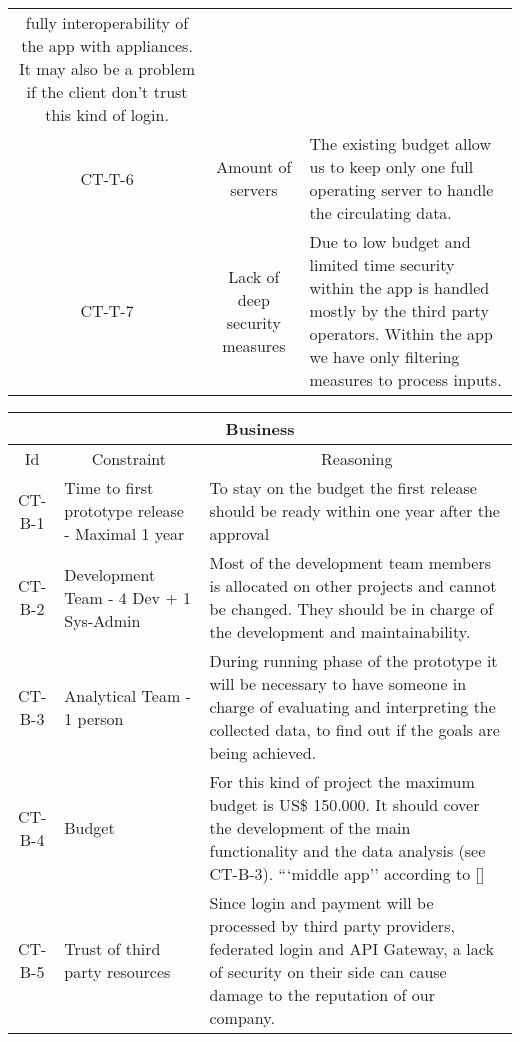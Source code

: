 \begin{table}[H]
\begin{tabularx}{\textwidth}{|c|c|X|}
        fully interoperability of the app with appliances. It may also be a problem if the \gls{client}
        don't trust this kind of login. \\
        CT-T-6 & Amount of servers & The existing budget allow us to keep only one full operating server to handle
        the circulating data. \\
        CT-T-7 & Lack of deep security measures & Due to low budget and limited time security within the app is handled 
        mostly by the third party operators. Within the app we have only filtering measures to process inputs. \\
        \bottomrule
    \end{tabularx}
\end{table}

\begin{table}[H]
    \begin{tabularx}{\textwidth}{|c|X|X|}
        \hline
        \multicolumn{3}{c}{\textbf{Business}} \\
        \hline
        \toprule
        \multicolumn{1}{c}{Id} & \multicolumn{1}{c}{Constraint} & \multicolumn{1}{c}{Reasoning} \\
        \midrule
        CT-B-1 & Time to first prototype release - Maximal 1 year & To stay on the budget the first release should
        be ready within one year after the approval \\
        CT-B-2 & Development Team - 4 Dev + 1 Sys-Admin & Most of the development team members is allocated on
        other projects and cannot be changed. They should be in charge of the development and maintainability. \\
        CT-B-3 & Analytical Team - 1 person & During running phase of the prototype it will be necessary to have someone 
        in charge of evaluating and interpreting the collected data, to find out if the goals are being achieved. \\
        CT-B-4 & Budget & For this kind of project the maximum budget is US\$ 150.000. It should cover the development of 
        the main functionality and the data analysis (see CT-B-3).  ```middle app'' according to [\cite{refonline:SPDLOAD}] \\
        CT-B-5 & Trust of third party resources & Since login and payment will be processed by third party providers,
        \gls{federated login} and \gls{API Gateway}, a lack of security on their side can cause damage to the reputation of 
        our company. \\
        \bottomrule
    \end{tabularx}
\end{table}




